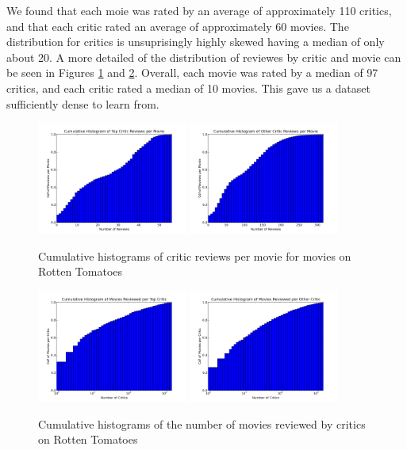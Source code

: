 \documentclass[12pt]{article}
\begin{document}
We found that each moie was rated by an average of approximately 110 critics, 
and that each critic rated an average of approximately 60 movies. 
The distribution for critics is unsuprisingly highly skewed having a median 
of only about 20. A more detailed of the distribution of reviewes by critic
and movie can be seen in Figures \ref{fig:r_mov} and \ref{fig:r_crit}.
Overall, each movie was rated by a median of 97 critics, and each critic rated 
a median of 10 movies. This gave us a dataset sufficiently dense to learn from.

\begin{figure}[H]
    \centering
    \includegraphics[width=0.44\textwidth, height=140px]{data_plots/plot_r_mov_top.png}
    \includegraphics[width=0.44\textwidth, height=140px]{data_plots/plot_r_mov_oth.png}
    \caption{Cumulative histograms of critic reviews per movie for movies on Rotten Tomatoes}
    \label{fig:r_mov} 
\end{figure}

\begin{figure}[H]
    \centering
    \includegraphics[width=0.44\textwidth, height=140px]{data_plots/plot_r_crit_top.png}
    \includegraphics[width=0.44\textwidth, height=140px]{data_plots/plot_r_crit_oth.png}
    \caption{Cumulative histograms of the number of movies reviewed by critics on Rotten Tomatoes}
    \label{fig:r_crit}
\end{figure}
\end{document}
